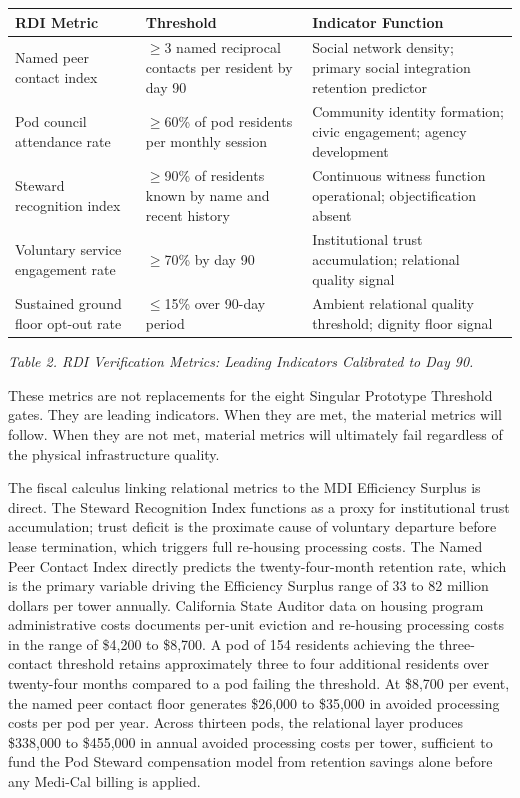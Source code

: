 \documentclass[12pt, letterpaper]{article}
\begin{document}
{\singlespacing
\begin{tabularx}{\textwidth}{@{}lp{3cm}X@{}}
\toprule
\rowcolor{rowgray}
RDI Metric & Threshold & Indicator Function \\
\midrule
Named peer contact index & $\geq$3 named reciprocal contacts per resident by day 90 & Social network density; primary social integration retention predictor \\
\rowcolor{rowgray}
Pod council attendance rate & $\geq$60\% of pod residents per monthly session & Community identity formation; civic engagement; agency development \\
Steward recognition index & $\geq$90\% of residents known by name and recent history & Continuous witness function operational; objectification absent \\
\rowcolor{rowgray}
Voluntary service engagement rate & $\geq$70\% by day 90 & Institutional trust accumulation; relational quality signal \\
Sustained ground floor opt-out rate & $\leq$15\% over 90-day period & Ambient relational quality threshold; dignity floor signal \\
\bottomrule
\end{tabularx}\par
\vspace{8pt}
\noindent\textit{Table 2. RDI Verification Metrics: Leading Indicators Calibrated to Day 90.}
\par}

These metrics are not replacements for the eight Singular Prototype Threshold gates. They are leading indicators. When they are met, the material metrics will follow. When they are not met, material metrics will ultimately fail regardless of the physical infrastructure quality.

The fiscal calculus linking relational metrics to the MDI Efficiency Surplus is direct. The Steward Recognition Index functions as a proxy for institutional trust accumulation; trust deficit is the proximate cause of voluntary departure before lease termination, which triggers full re-housing processing costs. The Named Peer Contact Index directly predicts the twenty-four-month retention rate, which is the primary variable driving the Efficiency Surplus range of 33 to 82 million dollars per tower annually. California State Auditor data on housing program administrative costs documents per-unit eviction and re-housing processing costs in the range of \$4,200 to \$8,700. A pod of 154 residents achieving the three-contact threshold retains approximately three to four additional residents over twenty-four months compared to a pod failing the threshold. At \$8,700 per event, the named peer contact floor generates \$26,000 to \$35,000 in avoided processing costs per pod per year. Across thirteen pods, the relational layer produces \$338,000 to \$455,000 in annual avoided processing costs per tower, sufficient to fund the Pod Steward compensation model from retention savings alone before any Medi-Cal billing is applied.
\end{document}
